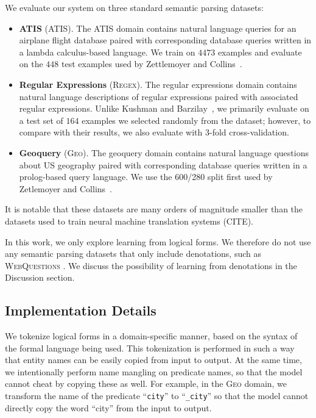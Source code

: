 \documentclass[11pt,letterpaper]{article}
\newcommand{\atis}{\textsc{ATIS}\xspace}
\newcommand{\regex}{\textsc{Regex}\xspace}
\newcommand{\geo}{\textsc{Geo}\xspace}
\newcommand\pl[1]{\textcolor{red}{[PL: #1]}}
\begin{document}
We evaluate our system on three standard semantic parsing datasets:
\begin{itemize}
  \item \textbf{ATIS} (\atis).  The ATIS domain contains 
    natural language queries for an airplane flight database
    paired with corresponding database queries written in a 
    lambda calculus-based language.  
    We train on $4473$ examples and evaluate on the $448$
    test examples used by Zettlemoyer and 
    Collins~.

  \item \textbf{Regular Expressions} (\regex).  The regular expressions domain
  contains natural language descriptions of regular expressions
  paired with associated regular expressions.
  Unlike Kushman and Barzilay~, 
  we primarily evaluate
  on a test set of $164$ examples we selected randomly
  from the dataset;
  however, to compare with their results, we also evaluate
  with 3-fold cross-validation.

  \item \textbf{Geoquery} (\geo).  The geoquery domain
  contains natural language questions about US geography
  paired with corresponding database queries written in a prolog-based
  query language.
  We use the 600/280 split first used by
  Zetlemoyer and Collins~.
\end{itemize}

It is notable that these datasets are many orders of magnitude smaller
than the datasets used to train neural machine translation systems
(CITE).

In this work, we only explore learning from logical forms.
We therefore do not use any semantic parsing datasets
that only include denotations,
such as \textsc{WebQuestions} \cite{berant2013freebase}.
We discuss the possibility of learning from denotations
in the Discussion section.


\subsection{Implementation Details}
We tokenize logical forms in a domain-specific manner,
based on the syntax of the formal language being used.
This tokenization is performed in such a way that
entity names can be easily copied from input to output.
At the same time, we intentionally perform name mangling on predicate names,
so that the model cannot cheat by copying these as well.
For example, in the \geo domain, we transform the name
of the predicate ``\texttt{city}'' to ``\texttt{\_city}''
so that the model cannot directly copy the word ``city'' from the input 
to output.
\end{document}

